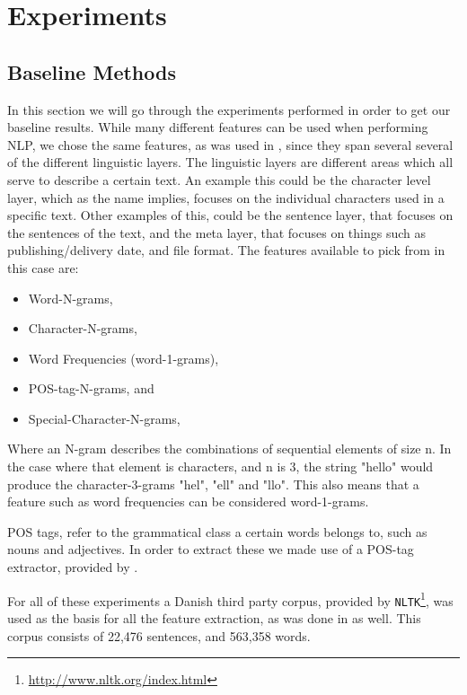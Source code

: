\section{Experiments} \label{sec:experiments}


\subsection{Baseline Methods} \label{subsec:baseline}

In this section we will go through the experiments performed in order to get
our baseline results. While many different features can be used when performing
\gls{NLP}, we chose the same features, as was used in \cite{US}, since they
span several several of the different linguistic layers. The linguistic layers
are different areas which all serve to describe a certain text. An example this
could be the character level layer, which as the name implies, focuses on the
individual characters used in a specific text. Other examples of this, could
be the sentence layer, that focuses on the sentences of the text, and the meta
layer, that focuses on things such as publishing/delivery date, and file format.
The features available to pick from in this case are:

\begin{itemize}
    \item Word-N-grams,
    \item Character-N-grams,
    \item Word Frequencies (word-1-grams),
    \item \gls{POS}-tag-N-grams, and
    \item Special-Character-N-grams,
\end{itemize}

Where an N-gram describes the combinations of sequential elements of size n. In
the case where that element is characters, and n is 3, the string "hello" would
produce the character-3-grams "hel", "ell" and "llo". This also means that a
feature such as word frequencies can be considered word-1-grams.

\gls{POS} tags, refer to the grammatical class a certain words belongs to,
such as nouns and adjectives. In order to extract these we made use
of a POS-tag extractor, provided by \cite{polyglot}.

For all of these experiments a Danish third party corpus, provided by
\texttt{NLTK}\footnote{\url{http://www.nltk.org/index.html}}, was used as the
basis for all the feature extraction, as was done in \cite{US} as well. This
corpus consists of 22,476 sentences, and 563,358 words.

